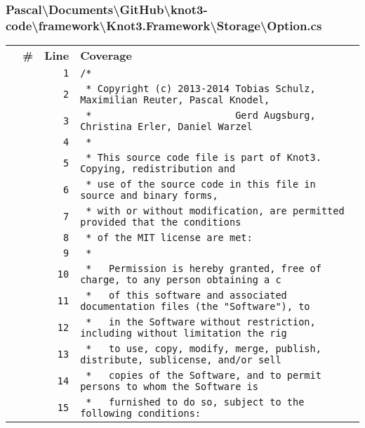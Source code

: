 \documentclass[a4paper,10pt]{article}
\begin{document}
\subsubsection{Pascal\textbackslash Documents\textbackslash GitHub\textbackslash knot3-code\textbackslash framework\textbackslash Knot3.Framework\textbackslash Storage\textbackslash Option.cs}
\begin{longtable}[l]{lrrl}
\textbf{} & \textbf{\#} & \textbf{Line} & \textbf{Coverage}\\
\cellcolor{gray} &  & \verb~1~ & \verb~/*~\\
\cellcolor{gray} &  & \verb~2~ & \verb~ * Copyright (c) 2013-2014 Tobias Schulz, Maximilian Reuter, Pascal Knodel,~\\
\cellcolor{gray} &  & \verb~3~ & \verb~ *                         Gerd Augsburg, Christina Erler, Daniel Warzel~\\
\cellcolor{gray} &  & \verb~4~ & \verb~ *~\\
\cellcolor{gray} &  & \verb~5~ & \verb~ * This source code file is part of Knot3. Copying, redistribution and~\\
\cellcolor{gray} &  & \verb~6~ & \verb~ * use of the source code in this file in source and binary forms,~\\
\cellcolor{gray} &  & \verb~7~ & \verb~ * with or without modification, are permitted provided that the conditions~\\
\cellcolor{gray} &  & \verb~8~ & \verb~ * of the MIT license are met:~\\
\cellcolor{gray} &  & \verb~9~ & \verb~ *~\\
\cellcolor{gray} &  & \verb~10~ & \verb~ *   Permission is hereby granted, free of charge, to any person obtaining a c~\\
\cellcolor{gray} &  & \verb~11~ & \verb~ *   of this software and associated documentation files (the "Software"), to ~\\
\cellcolor{gray} &  & \verb~12~ & \verb~ *   in the Software without restriction, including without limitation the rig~\\
\cellcolor{gray} &  & \verb~13~ & \verb~ *   to use, copy, modify, merge, publish, distribute, sublicense, and/or sell~\\
\cellcolor{gray} &  & \verb~14~ & \verb~ *   copies of the Software, and to permit persons to whom the Software is~\\
\cellcolor{gray} &  & \verb~15~ & \verb~ *   furnished to do so, subject to the following conditions:~\\

\end{longtable}
\end{document}
